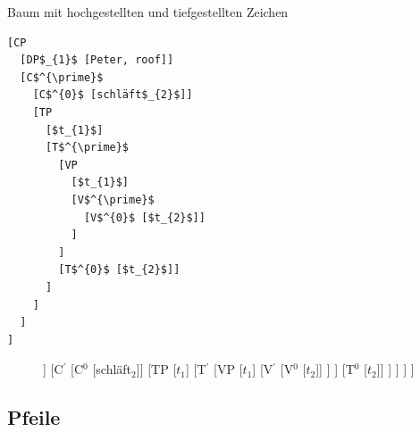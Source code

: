 \begin{frame}[fragile]

Baum mit hochgestellten und tiefgestellten Zeichen

\begin{minipage}[t]{.48\textwidth}
\footnotesize	
\begin{lstlisting}
[CP
  [DP$_{1}$ [Peter, roof]]
  [C$^{\prime}$
    [C$^{0}$ [schläft$_{2}$]]
    [TP
      [$t_{1}$]
      [T$^{\prime}$
        [VP
          [$t_{1}$]
          [V$^{\prime}$
            [V$^{0}$ [$t_{2}$]]
          ]
        ]
        [T$^{0}$ [$t_{2}$]]
      ]
    ]
  ]
]	
\end{lstlisting}
\end{minipage}
\begin{minipage}[t]{.48\textwidth}

\begin{figure}
\scriptsize
\centering 
\begin{forest}
[CP
	[DP$_{1}$ [Peter, roof]]
	[C$^{\prime}$
		[C$^{0}$ [schläft$_{2}$]]
		[TP
			[$t_{1}$]
			[T$^{\prime}$
				[VP
					[$t_{1}$]
					[V$^{\prime}$
						[V$^{0}$ [$t_{2}$]]
					]
				]
				[T$^{0}$ [$t_{2}$]]
			]
		]
	]
]	
\end{forest}
\end{figure}
\end{minipage}

\end{frame}


\subsection{Pfeile}

